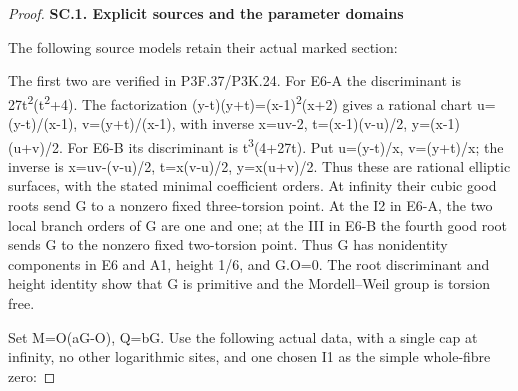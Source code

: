 \begin{proof}
\par

\medskip\noindent\textbf{SC.1. Explicit sources and the parameter domains}

The following source models retain their actual marked section:

\par{}\par\medskip

The first two are verified in P3F.37/P3K.24. For E6-A the discriminant
is 27t\textsuperscript{2}(t\textsuperscript{2}+4). The factorization
(y-t)(y+t)=(x-1)\textsuperscript{2}(x+2) gives a rational chart
u=(y-t)/(x-1), v=(y+t)/(x-1), with inverse
x=uv-2, t=(x-1)(v-u)/2, y=(x-1)(u+v)/2.
For E6-B its discriminant is t\textsuperscript{3}(4+27t). Put
u=(y-t)/x, v=(y+t)/x; the inverse is
x=uv-(v-u)/2, t=x(v-u)/2, y=x(u+v)/2.
Thus these are rational elliptic surfaces, with the stated minimal
coefficient orders. At infinity their cubic good roots send G to a
nonzero fixed three-torsion point. At the I2 in E6-A, the two local
branch orders of G are one and one; at the III in E6-B the fourth
good root sends G to the nonzero fixed two-torsion point. Thus G has
nonidentity components in E6 and A1, height 1/6, and G.O=0.
The root discriminant and height identity show that G is primitive
and the Mordell--Weil group is torsion free.

Set M=O(aG-O), Q=bG. Use the following actual data, with a single
cap at infinity, no other logarithmic sites, and one chosen I1 as
the simple whole-fibre zero:

\par{}\par\medskip


\end{proof}
